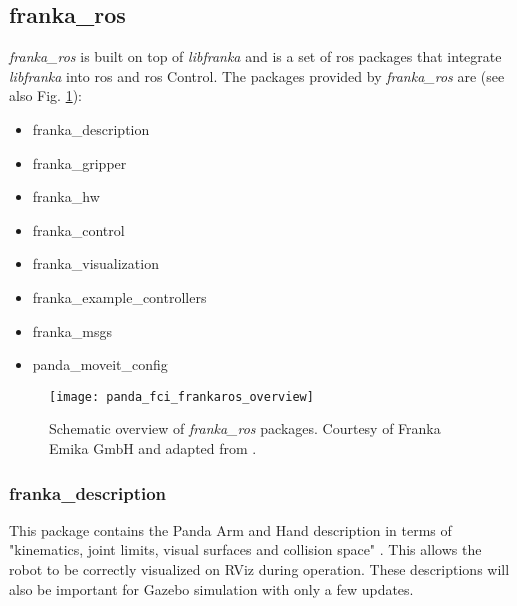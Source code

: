 \subsection{franka\_ros}
\label{subsec:ros_setup_robotic_system_integration_ros_franka_ros}

\textit{franka\_ros} is built on top of \textit{libfranka} and is a set of \gls{ros} packages that integrate \textit{libfranka} into \gls{ros} and \gls{ros} Control. The packages provided by \textit{franka\_ros} are (see also Fig. \ref{fig:panda_fci_frankaros_overview}):

\begin{itemize}
    \item franka\_description
    \item franka\_gripper
    \item franka\_hw
    \item franka\_control
    \item franka\_visualization
    \item franka\_example\_controllers
    \item franka\_msgs
    \item panda\_moveit\_config
\end{itemize}

\begin{figure}[htbp]
    \centering
	\texttt{[image: panda\_fci\_frankaros\_overview]}
	\caption[Schematic overview of \textit{franka\_ros} packages.]{Schematic overview of \textit{franka\_ros} packages. Courtesy of Franka Emika GmbH and adapted from \cite{FrankaEmikaGmbH_fci_documentation}.}
	\label{fig:panda_fci_frankaros_overview}
\end{figure}

\subsubsection*{franka\_description}
\label{subsubsec:ros_setup_robotic_system_integration_ros_franka_ros_franka_description}

This package contains the Panda Arm and Hand description in terms of "kinematics, joint limits, visual surfaces and collision space" \cite{FrankaEmikaGmbH_fci_documentation}. This allows the robot to be correctly visualized on RViz during operation. These descriptions will also be important for Gazebo simulation with only a few updates.


